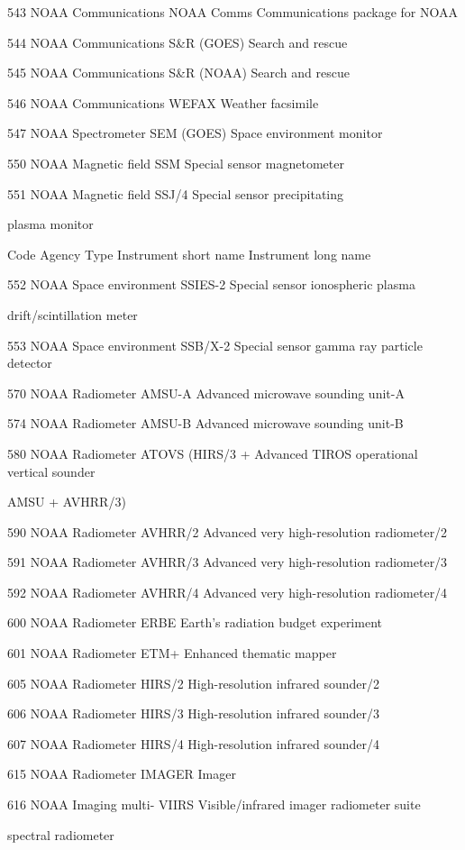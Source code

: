 543 NOAA Communications NOAA Comms Communications package for NOAA

544 NOAA Communications S\&R (GOES) Search and rescue

545 NOAA Communications S\&R (NOAA) Search and rescue

546 NOAA Communications WEFAX Weather facsimile

547 NOAA Spectrometer SEM (GOES) Space environment monitor

550 NOAA Magnetic field SSM Special sensor magnetometer

551 NOAA Magnetic field SSJ/4 Special sensor precipitating

plasma monitor

Code Agency Type Instrument short name Instrument long name

552 NOAA Space environment SSIES-2 Special sensor ionospheric plasma

drift/scintillation meter

553 NOAA Space environment SSB/X-2 Special sensor gamma ray particle detector

570 NOAA Radiometer AMSU-A Advanced microwave sounding unit-A

574 NOAA Radiometer AMSU-B Advanced microwave sounding unit-B

580 NOAA Radiometer ATOVS (HIRS/3 + Advanced TIROS operational vertical sounder

AMSU + AVHRR/3)

590 NOAA Radiometer AVHRR/2 Advanced very high-resolution radiometer/2

591 NOAA Radiometer AVHRR/3 Advanced very high-resolution radiometer/3

592 NOAA Radiometer AVHRR/4 Advanced very high-resolution radiometer/4

600 NOAA Radiometer ERBE Earth's radiation budget experiment

601 NOAA Radiometer ETM+ Enhanced thematic mapper

605 NOAA Radiometer HIRS/2 High-resolution infrared sounder/2

606 NOAA Radiometer HIRS/3 High-resolution infrared sounder/3

607 NOAA Radiometer HIRS/4 High-resolution infrared sounder/4

615 NOAA Radiometer IMAGER Imager

616 NOAA Imaging multi- VIIRS Visible/infrared imager radiometer suite

spectral radiometer

